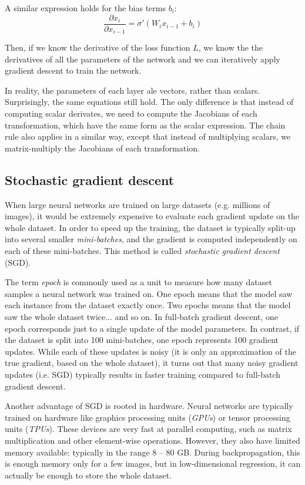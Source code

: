 \documentclass[12pt]{article}
\begin{document}
A similar expression holds for the bias terms $b_i$:
\begin{equation}
\frac{\partial x_{i}}{\partial x_{i-1}} = \sigma'(W_i x_{i-1} + b_i)
\end{equation}

Then, if we know the derivative of the loss function $L$, we know the the derivatives of all the parameters of the network and we can iteratively apply gradient descent to train the network.

In reality, the parameters of each layer ale vectors, rather than scalars. Surprisingly, the same equations still hold. The only difference is that instead of computing scalar derivates, we need to compute the Jacobians of each transformation, which have the same form as the scalar expression. The chain rule also applies in a similar way, except that instead of multiplying scalars, we matrix-multiply the Jacobians of each transformation.

\subsection{Stochastic gradient descent}

When large neural networks are trained on large datasets (e.g. millions of images), it would be extremely expensive to evaluate each gradient update on the whole dataset. In order to speed up the training, the dataset is typically split-up into several smaller \textit{mini-batches}, and the gradient is computed independently on each of these mini-batches. This method is called \textit{stochastic gradient descent} (SGD).

The term \textit{epoch} is commonly used as a unit to measure how many dataset samples a neural network was trained on. One epoch means that the model saw each instance from the dataset exactly once. Two epochs means that the model saw the whole dataset twice... and so on. In full-batch gradient descent, one epoch corresponds just to a single update of the model parameters. In contrast, if the dataset is split into 100 mini-batches, one epoch represents 100 gradient updates. While each of these updates is noisy (it is only an approximation of the true gradient, based on the whole dataset), it turns out that many noisy gradient updates (i.e. SGD) typically results in faster training compared to full-batch gradient descent.

Another advantage of SGD is rooted in hardware. Neural networks are typically trained on hardware like graphics processing units (\textit{GPUs}) or tensor processing units (\textit{TPUs}). These devices are very fast at parallel computing, such as matrix multiplication and other element-wise operations. However, they also have limited memory available: typically in the range 8 -- 80 GB. During backpropagation, this is enough memory only for a few images, but in low-dimensional regression, it can actually be enough to store the whole dataset.
\end{document}
